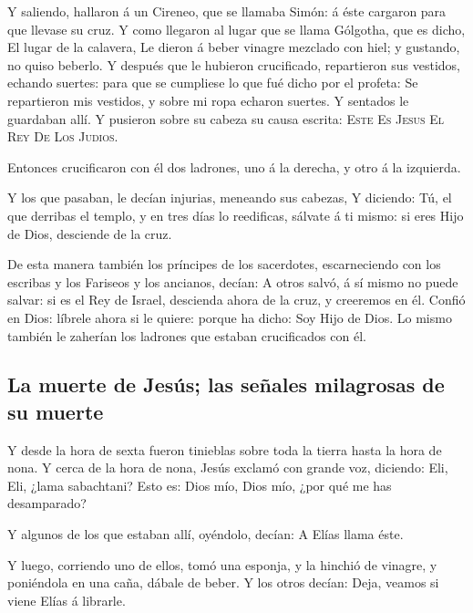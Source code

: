  Y saliendo, hallaron á un Cireneo, que se llamaba Simón:
á éste cargaron para que llevase su cruz.  Y como
llegaron al lugar que se llama Gólgotha, que es dicho, El lugar de la
calavera,  Le dieron á beber vinagre mezclado con hiel; y
gustando, no quiso beberlo.  Y después que le hubieron
crucificado, repartieron sus vestidos, echando suertes: para que se
cumpliese lo que fué dicho por el profeta: Se repartieron mis vestidos,
y sobre mi ropa echaron suertes.  Y sentados le guardaban
allí.  Y pusieron sobre su cabeza su causa escrita:
\textsc{Este} \textsc{Es} \textsc{Jesus} \textsc{El} \textsc{Rey}
\textsc{De} \textsc{Los} \textsc{Judios}.

 Entonces crucificaron con él dos ladrones, uno á la
derecha, y otro á la izquierda.

 Y los que pasaban, le decían injurias, meneando sus
cabezas,  Y diciendo: Tú, el que derribas el templo, y en
tres días lo reedificas, sálvate á ti mismo: si eres Hijo de Dios,
desciende de la cruz.

 De esta manera también los príncipes de los sacerdotes,
escarneciendo con los escribas y los Fariseos y los ancianos, decían:
 A otros salvó, á sí mismo no puede salvar: si es el Rey
de Israel, descienda ahora de la cruz, y creeremos en él.
 Confió en Dios: líbrele ahora si le quiere: porque ha
dicho: Soy Hijo de Dios.  Lo mismo también le zaherían
los ladrones que estaban crucificados con él.

\hypertarget{la-muerte-de-jesuxfas-las-seuxf1ales-milagrosas-de-su-muerte}{%
\subsection{La muerte de Jesús; las señales milagrosas de su
muerte}\label{la-muerte-de-jesuxfas-las-seuxf1ales-milagrosas-de-su-muerte}}

 Y desde la hora de sexta fueron tinieblas sobre toda la
tierra hasta la hora de nona.  Y cerca de la hora de
nona, Jesús exclamó con grande voz, diciendo: Eli, Eli, ¿lama
sabachtani? Esto es: Dios mío, Dios mío, ¿por qué me has desamparado?

 Y algunos de los que estaban allí, oyéndolo, decían: A
Elías llama éste.

 Y luego, corriendo uno de ellos, tomó una esponja, y la
hinchió de vinagre, y poniéndola en una caña, dábale de beber.
 Y los otros decían: Deja, veamos si viene Elías á
librarle.

